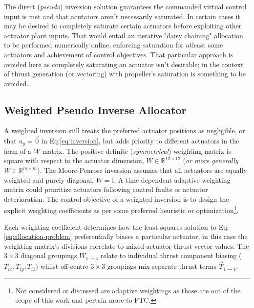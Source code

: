 \par
The direct (\emph{pseudo}) inversion solution guarantees the commanded virtual control input is met and that acutators aren't necessarily saturated. In certain cases it may be desired to completely saturate certain actuators before exploiting other actuator plant inputs. That would entail an iterative "daisy chaining"\cite{allocation} allocation to be performed numerically online, enforcing saturation for atleast some actuators and achievement of control objectives. That particular approach is avoided here as completely saturating an actuator isn't desirable; in the context of thrust generation (or vectoring) with propeller's saturation is something to be avoided\ldots
\subsection{Weighted Pseudo Inverse Allocator}
\label{subsec:control.allocation.weightedinverse}
A weighted inversion still treats the preferred actuator positions as negligible, or that $u_p=\vec{0}$ in Eq:\ref{eq:inversion}, but adds priority to different actuators in the form of a $W$ matrix. The positive definite (\emph{symmetrical}) weighting matrix is square with respect to the actuator dimension, $W\in\mathbb{R}^{12\times 12}$ (\emph{or more generally $W\in\mathbb{R}^{m\times m}$}). The Moore-Penrose inversion assumes that all actuators are equally weighted and purely diagonal, $W=\mathbb{I}$. A time dependent adaptive weighting matrix could prioritize actuators following control faults or actuator deterioration. The control objective of a weighted inversion is to design the explicit weighting coefficients as per some preferred heuristic or optimization\footnote{Not considered or discussed are adaptive weightings as those are out of the scope of this work and pertain more to FTC\cite{FTCallocation}.}.
\par
Each weighting coefficient determines how the least squares solution to Eq:\ref{eq:allocation-problem} preferentially biases a particular actuator, in this case the weighting matrix's divisions correlate to mixed actuator thrust vector values. The $3\times 3$ diagonal groupings $W_{1\rightarrow 4}$ relate to individual thrust component biasing ($T_{ix},T_{iy},T_{iz}$) whilst off-centre $3\times 3$ groupings mix separate thrust terms $\vec{T}_{1\rightarrow 4}$. 
\par
